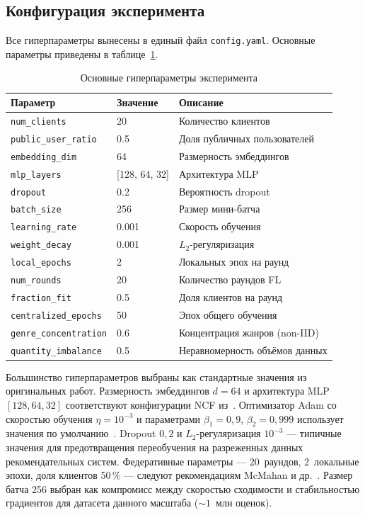 \documentclass[14pt,a4paper]{extarticle}
\begin{document}
\subsection{Конфигурация эксперимента}

Все гиперпараметры вынесены в единый файл \texttt{config.yaml}. Основные параметры приведены в таблице~\ref{tab:config}.

\begin{table}[H]
\caption{Основные гиперпараметры эксперимента}
\label{tab:config}
\centering
\begin{tabularx}{\textwidth}{llX}
\toprule
\textbf{Параметр} & \textbf{Значение} & \textbf{Описание} \\
\midrule
\texttt{num\_clients}     & 20    & Количество клиентов \\
\texttt{public\_user\_ratio} & 0.5 & Доля публичных пользователей \\
\texttt{embedding\_dim}   & 64    & Размерность эмбеддингов \\
\texttt{mlp\_layers}      & [128, 64, 32] & Архитектура MLP \\
\texttt{dropout}          & 0.2   & Вероятность dropout \\
\texttt{batch\_size}      & 256   & Размер мини-батча \\
\texttt{learning\_rate}   & 0.001 & Скорость обучения \\
\texttt{weight\_decay}    & 0.001 & $L_2$-регуляризация \\
\texttt{local\_epochs}    & 2     & Локальных эпох на раунд \\
\texttt{num\_rounds}      & 20    & Количество раундов FL \\
\texttt{fraction\_fit}    & 0.5   & Доля клиентов на раунд \\
\texttt{centralized\_epochs} & 50 & Эпох общего обучения \\
\texttt{genre\_concentration} & 0.6 & Концентрация жанров (non-IID) \\
\texttt{quantity\_imbalance}  & 0.5 & Неравномерность объёмов данных \\
\bottomrule
\end{tabularx}
\end{table}

Большинство гиперпараметров выбраны как стандартные значения из оригинальных работ.
Размерность эмбеддингов $d=64$ и архитектура MLP $[128, 64, 32]$ соответствуют конфигурации NCF из~\cite{he2017neural}.
Оптимизатор Adam со скоростью обучения $\eta=10^{-3}$ и параметрами $\beta_1=0{,}9$, $\beta_2=0{,}999$ использует значения по умолчанию~\cite{kingma2015adam}.
Dropout $0{,}2$ и $L_2$-регуляризация $10^{-3}$ --- типичные значения для предотвращения переобучения на разреженных данных рекомендательных систем.
Федеративные параметры --- 20~раундов, 2~локальные эпохи, доля клиентов 50\,\% --- следуют рекомендациям McMahan и др.~\cite{mcmahan2017communication}.
Размер батча 256 выбран как компромисс между скоростью сходимости и стабильностью градиентов для датасета данного масштаба (${\sim}1$~млн оценок).
\end{document}
